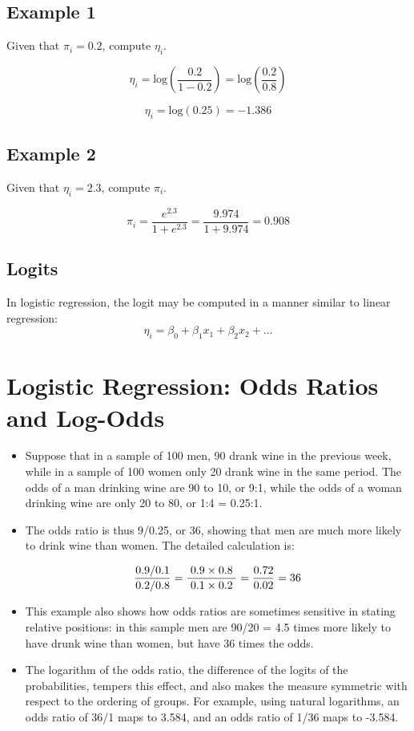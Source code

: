 \documentclass[a4paper,12pt]{article}
\begin{document}
\subsection*{Example 1}
Given that $\pi_i = 0.2$, compute $\eta_i$.

\[ \eta_i = \mbox{log}\left( \frac{0.2}{1-0.2} \right)= \mbox{log}\left( \frac{0.2}{0.8} \right)\] 

\[ \eta_i =  \mbox{log}(0.25) =-1.386 \]

\subsection*{Example 2}
Given that $\eta_i = 2.3$, compute $\pi_i$.

\[ \pi_i  =  \frac{e^{2.3}}{1 + e^{2.3}} = \frac{9.974}{1 + 9.974} = 0.908 \]


\subsection*{Logits}
In logistic regression, the logit may be computed in a manner similar to linear regression:
\[ \eta_i = \beta_0 + \beta_1x_1 + \beta_2x_2 + \ldots  \]


\section{Logistic Regression: Odds Ratios and Log-Odds}
\begin{itemize}
	\item Suppose that in a sample of 100 men, 90 drank wine in the previous week, while in a sample of 100 women only 20 drank wine in the same period. The odds of a man drinking wine are 90 to 10, or 9:1, while the odds of a woman drinking wine are only 20 to 80, or 1:4 = 0.25:1. 
	\item The odds ratio is thus 9/0.25, or 36, showing that men are much more likely to drink wine than women. The detailed calculation is:
	
	\[ { 0.9/0.1 \over 0.2/0.8}=\frac{\;0.9\times 0.8\;}{\;0.1\times 0.2\;} ={0.72 \over 0.02} = 36 \]
	
	\item This example also shows how odds ratios are sometimes sensitive in stating relative positions: in this sample men are 90/20 = 4.5 times more likely to have drunk wine than women, but have 36 times the odds. 
	
	
	\item The logarithm of the odds ratio, the difference of the logits of the probabilities, tempers this effect, and also makes the measure symmetric with respect to the ordering of groups. For example, using natural logarithms, an odds ratio of 36/1 maps to 3.584, and an odds ratio of 1/36 maps to -3.584.
\end{itemize}
\end{document}
